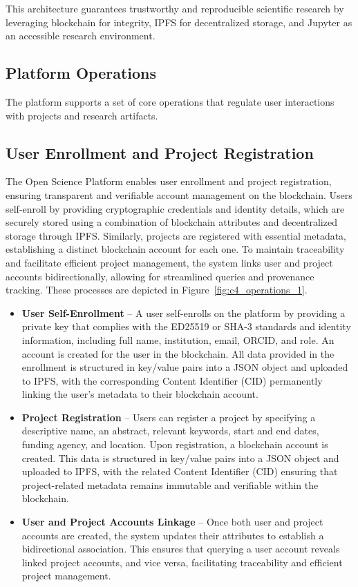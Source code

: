 \documentclass[final]{rc-book-2.14}
\begin{document}
This architecture guarantees trustworthy and reproducible scientific research by leveraging blockchain for integrity, IPFS for decentralized storage, and Jupyter as an accessible research environment.





\subsection{Platform Operations}
The platform supports a set of core operations that regulate user interactions with projects and research artifacts.

\subsection{User Enrollment and Project Registration}

\sloppy
The Open Science Platform enables user enrollment and project registration, ensuring transparent and verifiable account management on the blockchain. Users self-enroll by providing cryptographic credentials and identity details, which are securely stored using a combination of blockchain attributes and decentralized storage through IPFS. Similarly, projects are registered with essential metadata, establishing a distinct blockchain account for each one. To maintain traceability and facilitate efficient project management, the system links user and project accounts bidirectionally, allowing for streamlined queries and provenance tracking. These processes are depicted in Figure~\ref{fig:c4_operations_1}.
\fussy

\begin{itemize}
    \item \textbf{User Self-Enrollment} – A user self-enrolls on the platform by providing a private key that complies with the ED25519 or SHA-3 standards and identity information, including full name, institution, email, ORCID, and role. An account is created for the user in the blockchain. All data provided in the enrollment is structured in key/value pairs into a JSON object and uploaded to IPFS, with the corresponding Content Identifier (CID) permanently linking the user’s metadata to their blockchain account.

    \item \textbf{Project Registration} – Users can register a project by specifying a descriptive name, an abstract, relevant keywords, start and end dates, funding agency, and location. Upon registration, a blockchain account is created. This data is structured in key/value pairs into a JSON object and uploaded to IPFS, with the related Content Identifier (CID) ensuring that project-related metadata remains immutable and verifiable within the blockchain.

    \item \textbf{User and Project Accounts Linkage} – Once both user and project accounts are created, the system updates their attributes to establish a bidirectional association. This ensures that querying a user account reveals linked project accounts, and vice versa, facilitating traceability and efficient project management.
\end{itemize}
\end{document}
